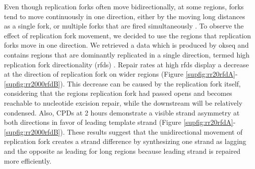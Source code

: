 Even though replication forks often move bidirectionally, at some regions, forks tend to move continuously in one direction, either by the moving long distances as a single fork, or multiple forks that are fired simultaneously \citep{takebayashi2017anatomy}. To observe the effect of replication fork movement, we decided to use the regions that replication forks move in one direction. We retrieved a data which is produced by \gls{okseq} and contains regions that are dominantly replicated in a single direction, termed high replication fork directionality (\gls{rfd}s) \citep{petryk2016replication}. Repair rates at high \gls{rfd}s display a decrease at the direction of replication fork on wider regions (Figure \ref{supfig:rr20rfdA}-\ref{supfig:rr2000rfdB}). This decrease can be caused by the replication fork itself, considering that the regions replication fork had passed opens and becomes reachable to nucleotide excision repair, while the downstream will be relatively condensed. Also, \gls{CPD}s at 2 hours demonstrate a visible strand asymmetry at both directions in favor of leading template strand (Figure \ref{supfig:rr20rfdA}-\ref{supfig:rr2000rfdB}). These results suggest that the unidirectional movement of replication fork creates a strand difference by synthesizing one strand as lagging and the opposite as leading for long regions because leading strand is repaired more efficiently.

